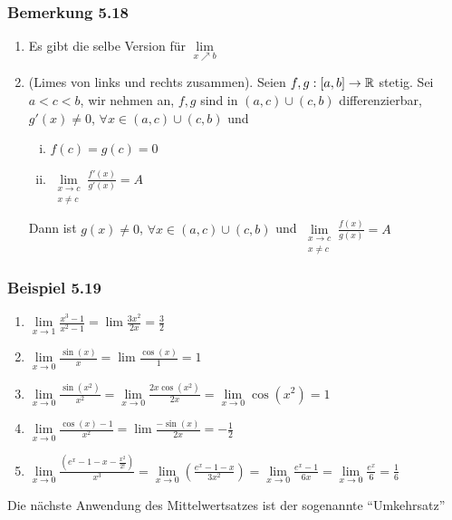 \subsubsection*{Bemerkung 5.18}
\begin{enumerate}
\item Es gibt die selbe Version für $\mathop {\lim }\limits_{x \nearrow b} $
\item (Limes von links und rechts zusammen). Seien $f,g:\lbrack a,b\rbrack\to\mathbb{R}$ stetig. Sei $a<c<b$, wir nehmen an, $f,g$ sind in $\left( {a,c} \right) \cup \left( {c,b} \right)$ differenzierbar, $g'(x)\not=0$, $\forall x\in\left( {a,c} \right) \cup \left( {c,b} \right)$ und
\begin{enumerate}[(i)]
\item $f(c)=g(c)=0$
\item $\mathop {\lim }\limits_{\begin{array}{*{20}{c}}
{x \to c}\\
{x\not  = c}
\end{array}} \frac{{f'\left( x \right)}}{{g'\left( x \right)}} = A$
\end{enumerate}
Dann ist $g(x)\not=0$, $\forall x\in\left( {a,c} \right) \cup \left( {c,b} \right)$ und $\mathop {\lim }\limits_{\begin{array}{*{20}{c}}
{x \to c}\\
{x\not  = c}
\end{array}} \frac{{f\left( x \right)}}{{g\left( x \right)}} = A$
\end{enumerate}

\subsubsection*{Beispiel 5.19}
\begin{enumerate}
\item $\mathop {\lim }\limits_{x \to 1} \frac{{{x^3} - 1}}{{{x^2} - 1}} = \lim \frac{{3{x^2}}}{{2x}} = \frac{3}{2}$
\item $\mathop {\lim }\limits_{x \to 0} \frac{{\sin \left( x \right)}}{x} = \lim \frac{{\cos \left( x \right)}}{1} = 1$
\item $\mathop {\lim }\limits_{x \to 0} \frac{{\sin \left( {{x^2}} \right)}}{{{x^2}}} = \mathop {\lim }\limits_{x \to 0} \frac{{2x\cos \left( {{x^2}} \right)}}{{2x}} = \mathop {\lim }\limits_{x \to 0} \cos \left( {{x^2}} \right) = 1$
\item $\mathop {\lim }\limits_{x \to 0} \frac{{\cos \left( x \right) - 1}}{{{x^2}}} = \lim \frac{{ - \sin \left( x \right)}}{{2x}} =  - \frac{1}{2}$
\item $\mathop {\lim }\limits_{x \to 0} \frac{{\left( {{e^x} - 1 - x - \frac{{{x^2}}}{{2!}}} \right)}}{{{x^3}}} = \mathop {\lim }\limits_{x \to 0} \left( {\frac{{{e^x} - 1 - x}}{{3{x^2}}}} \right) = \mathop {\lim }\limits_{x \to 0} \frac{{{e^x} - 1}}{{6x}} = \mathop {\lim }\limits_{x \to 0} \frac{{{e^x}}}{6} = \frac{1}{6}$
\end{enumerate}
Die nächste Anwendung des Mittelwertsatzes ist der sogenannte ``Umkehrsatz''
